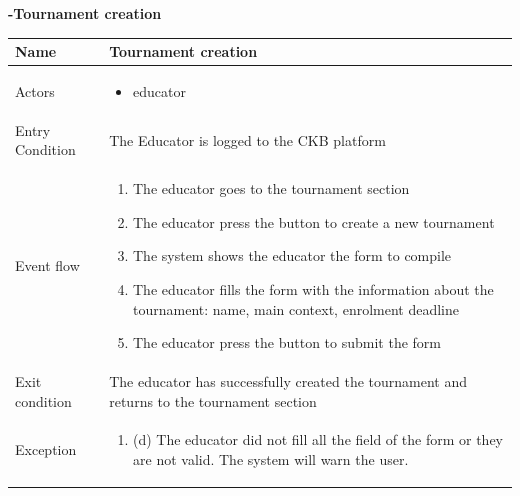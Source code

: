 \begin{enumerate}[label=\textbf{[UC\arabic*]}]
    \item  \textbf{-Tournament creation}
    \\\begin{tabular}{|l|p{11cm}|}
        \hline
        Name & Tournament creation \\
        \hline
        Actors & \begin{itemize}
                    \item educator
                \end{itemize} \\
        \hline
        Entry Condition & The Educator is logged to the CKB platform\\
        \hline
        Event flow & \begin{enumerate}
            \item The educator goes to the tournament section
            \item The educator press the button to create a new tournament
            \item The system shows the educator the form to compile
            \item The educator fills the form with the information about the tournament:
            name, main context, enrolment deadline
            \item The educator press the button to submit the form
        \end{enumerate}\\
        \hline
        Exit condition & The educator has successfully created the tournament and returns to the tournament section  \\
        \hline
        Exception & \begin{enumerate} [label={}, leftmargin=0.25cm ]
            \item (d) The educator did not fill all the field of the form or they are not valid. The system will warn the user.
        \end{enumerate} \\
        \hline            
    \end{tabular}


\end{enumerate}
